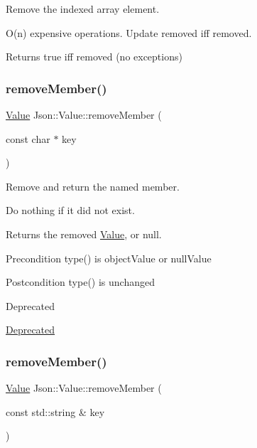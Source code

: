 Remove the indexed array element. 

O(n) expensive operations. Update \textquotesingle{}removed\textquotesingle{} iff removed. \begin{DoxyReturn}{Returns}
true iff removed (no exceptions) 
\end{DoxyReturn}
\mbox{\label{class_json_1_1_value_aa52f7873b95d29627d6e83ba96f69aaa}} 
\subsubsection{\texorpdfstring{remove\+Member()}{removeMember()}\hspace{0.1cm}{\footnotesize\ttfamily [1/4]}}
{\footnotesize\ttfamily \hyperlink{class_json_1_1_value}{Value} Json\+::\+Value\+::remove\+Member (\begin{DoxyParamCaption}\item[{const char $\ast$}]{key }\end{DoxyParamCaption})}



Remove and return the named member. 

Do nothing if it did not exist. \begin{DoxyReturn}{Returns}
the removed \hyperlink{class_json_1_1_value}{Value}, or null. 
\end{DoxyReturn}
\begin{DoxyPrecond}{Precondition}
type() is object\+Value or null\+Value 
\end{DoxyPrecond}
\begin{DoxyPostcond}{Postcondition}
type() is unchanged 
\end{DoxyPostcond}
\begin{DoxyRefDesc}{Deprecated}
\item[\hyperlink{deprecated__deprecated000001}{Deprecated}]\end{DoxyRefDesc}
\mbox{\label{class_json_1_1_value_ae1f95f7ca3906e6bcc2a7be93210ecba}} 
\subsubsection{\texorpdfstring{remove\+Member()}{removeMember()}\hspace{0.1cm}{\footnotesize\ttfamily [2/4]}}
{\footnotesize\ttfamily \hyperlink{class_json_1_1_value}{Value} Json\+::\+Value\+::remove\+Member (\begin{DoxyParamCaption}\item[{const std\+::string \&}]{key }\end{DoxyParamCaption})}

